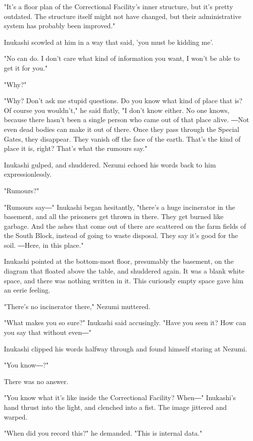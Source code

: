 "It's a floor plan of the Correctional Facility's inner structure, but
it's pretty outdated. The structure itself might not have changed, but
their administrative system has probably been improved."

Inukashi scowled at him in a way that said, 'you must be kidding me'.

"No can do. I don't care what kind of information you want, I won't be
able to get it for you."

"Why?"

"Why? Don't ask me stupid questions. Do you know what kind of place that
is? Of course you wouldn't," he said flatly, "I don't know either. No
one knows, because there hasn't been a single person who came out of
that place alive. ―Not even dead bodies can make it out of there. Once
they pass through the Special Gates, they disappear. They vanish off the
face of the earth. That's the kind of place it is, right? That's what
the rumours say."

Inukashi gulped, and shuddered. Nezumi echoed his words back to him
expressionlessly.

"Rumours?"

"Rumours say―" Inukashi began hesitantly, "there's a huge incinerator in
the basement, and all the prisoners get thrown in there. They get burned
like garbage. And the ashes that come out of there are scattered on the
farm fields of the South Block, instead of going to waste disposal. They
say it's good for the soil. ―Here, in this place."

Inukashi pointed at the bottom-most floor, presumably the basement, on
the diagram that floated above the table, and shuddered again. It was a
blank white space, and there was nothing written in it. This curiously
empty space gave him an eerie feeling.

"There's no incinerator there," Nezumi muttered.

"What makes you so sure?" Inukashi said accusingly. "Have you seen it?
How can you say that without even―"

Inukashi clipped his words halfway through and found himself staring at
Nezumi.

"You know―?"

There was no answer.

"You know what it's like inside the Correctional Facility? When―"
Inukashi's hand thrust into the light, and clenched into a fist. The
image jittered and warped.

"When did you record this?" he demanded. "This is internal data."

